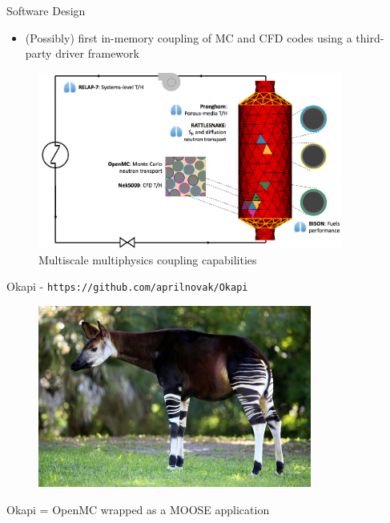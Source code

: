 \documentclass[10pt]{beamer}
\begin{document}
\begin{frame}{Software Design}
\begin{itemize}
\item (Possibly) first in-memory coupling of MC and CFD codes using a third-party driver framework
\end{itemize}

\begin{figure}
\includegraphics[width=10cm]{../Figures/MOOSE_capabilities.png}
\caption{Multiscale multiphysics coupling capabilities}
\end{figure}
\end{frame}

\begin{frame}{Okapi - {\tt https://github.com/aprilnovak/Okapi}}

\begin{figure}
\includegraphics[width=9cm]{../Figures/okapi_animal.jpg}
\end{figure}

\centering
Okapi = OpenMC wrapped as a MOOSE application
\end{frame}
\end{document}
